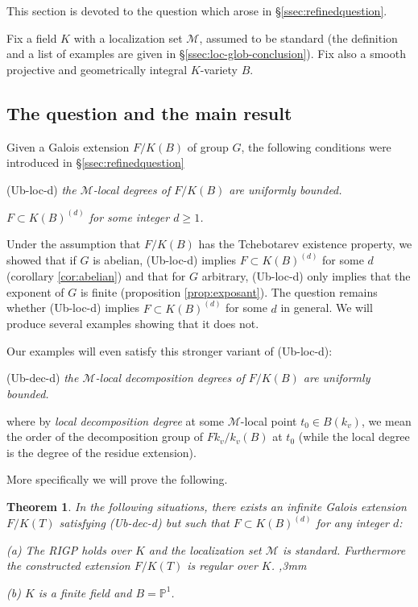 \documentclass[12pt,english]{amsart}
\newtheorem{theorem}{Theorem}[section]
\newtheorem{twisting lemma}[theorem]{Twisting lemma}
\begin{document}
This section is devoted to the question which arose in \S \ref{ssec:refinedquestion}.

Fix a field $K$ with a localization set ${\mathcal M}$, assumed to be standard (the definition and a list of examples are given in \S \ref{ssec:loc-glob-conclusion}). 
Fix also a smooth projective and geometrically integral $K$-variety $B$. 

\subsection{The question and the main result} \label{ssec:the-question}
Given a Galois extension $F/K(B)$ of group $G$, the following conditions 
were introduced in \S \ref{ssec:refinedquestion}

\vskip 2mm

\noindent 
{\rm (Ub-loc-d)} {\it the ${\mathcal M}$-local degrees of $F/K(B)$ are uniformly bounded.}
\vskip 2mm

\noindent 
 {\it $F\subset K(B)^{(d)}$ for some integer $d\geq 1$.} 
\vskip 2mm

\noindent 
Under the assumption that $F/K(B)$ has the Tchebotarev existence property, we showed that if $G$ is abelian, (Ub-loc-d) implies $F\subset K(B)^{(d)}$ for some $d$ (corollary \ref{cor:abelian}) and that for $G$ arbitrary,  (Ub-loc-d) only implies that the exponent of $G$ is finite (proposition \ref{prop:exposant}). The question remains whether 
 (Ub-loc-d) implies $F\subset K(B)^{(d)}$ for some $d$ in general. We will produce several examples showing 
that it does not.

Our examples will even satisfy this stronger variant of (Ub-loc-d): 
\vskip 2mm

\noindent 
(Ub-dec-d)  {\it the ${\mathcal M}$-local decomposition degrees of $F/K(B)$ are uniformly bounded.}
\vskip 2mm

\noindent
where by {\it local decomposition degree} at some $\mathcal{M}$-local point $t_0\in B(k_v)$, we mean the order of the decomposition group of $Fk_v/k_v(B)$ at $t_0$ (while the local degree is the degree of the residue extension).

More specifically we will prove the following.

\begin{theorem}  \label{thm:3-examples}
In the following situations, there exists an infinite 
Galois extension $F/K(T)$ satisfying {\rm (Ub-dec-d)} but such that $F\subset K(B)^{(d)}$ for any integer $d$:
\vskip 1mm

\noindent
{\rm (a)} The RIGP holds over $K$ and the localization set ${\mathcal M}$ is standard.
Furthermore the constructed extension $F/K(T)$ is regular over $K$.
,3mm

\noindent
{\rm (b)} $K$ is a finite field and $B={\mathbb{P}}^1$.
\end{theorem}
\end{document}
